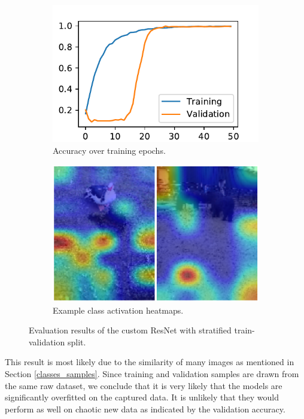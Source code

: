 \documentclass{l4proj}
\begin{document}
\begin{figure}[ht]
  \centering
  \begin{subfigure}[h!]{0.42\textwidth}
    \includegraphics[width=\textwidth, trim={0cm 0cm 0cm 0cm}, clip=true]{images/evaluation/stratified/accuracy}
    \caption{Accuracy over training epochs.}
    \label{fig:acc_stratified}
  \end{subfigure}
  \begin{subfigure}[h!]{0.4\textwidth}
    \includegraphics[width=\textwidth]{images/evaluation/stratified/heatmaps.png}
    \caption{Example class activation heatmaps.}
    \label{fig:heatmap_stratified}
  \end{subfigure}
  \caption{Evaluation results of the custom ResNet with stratified train-validation split.}
\end{figure}

This result is most likely due to the similarity of many images as mentioned in Section \ref{classes_samples}. Since training and validation samples are drawn from the same raw dataset, we conclude that it is very likely that the models are significantly overfitted on the captured data. It is unlikely that they would perform as well on chaotic new data as indicated by the validation accuracy. 
\end{document}
